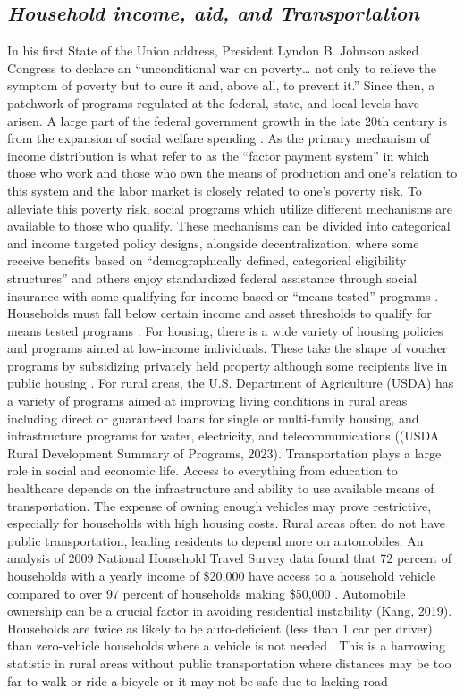 \subsection{\textit{Household income, aid, and Transportation }}
In his first State of the Union address, President Lyndon B. Johnson asked Congress to declare an “unconditional war on poverty… not only to relieve the symptom of poverty but to cure it and, above all, to prevent it.” Since then, a patchwork of programs regulated at the federal, state, and local levels have arisen. A large part of the federal government growth in the late 20th century is from the expansion of social welfare spending \citep{fishback_social_2020}. As the primary mechanism of income distribution is what \citet{berkowitz_gaps_2023} refer to as the “factor payment system” in which those who work and those who own the means of production and one’s relation to this system and the labor market is closely related to one’s poverty risk. To alleviate this poverty risk, social programs which utilize different mechanisms are available to those who qualify. These mechanisms can be divided into categorical and income targeted policy designs, alongside decentralization, where some receive benefits based on “demographically defined, categorical eligibility structures” and others enjoy standardized federal assistance through social insurance with some qualifying for income-based or “means-tested” programs \citep{bruch_poverty_2023}. Households must fall below certain income and asset thresholds to qualify for means tested programs \citep{rank_welfare_2002}. For housing, there is a wide variety of housing policies and programs aimed at low-income individuals. These take the shape of voucher programs by subsidizing privately held property although some recipients live in public housing \citep{kim_housing_2017}. For rural areas, the U.S. Department of Agriculture (USDA) has a variety of programs aimed at improving living conditions in rural areas including direct or guaranteed loans for single or multi-family housing, and infrastructure programs for water, electricity, and telecommunications ((USDA Rural Development Summary of Programs, 2023). Transportation plays a large role in social and economic life. Access to everything from education to healthcare depends on the infrastructure and ability to use available means of transportation. The expense of owning enough vehicles may prove restrictive, especially for households with high housing costs. Rural areas often do not have public transportation, leading residents to depend more on automobiles. An analysis of 2009 National Household Travel Survey data found that 72 percent of households with a yearly income of \$20,000 have access to a household vehicle compared to over 97 percent of households making \$50,000 \citep{blumenberg_automobile_2012}. Automobile ownership can be a crucial factor in avoiding residential instability (Kang, 2019). Households are twice as likely to be auto-deficient (less than 1 car per driver) than zero-vehicle households where a vehicle is not needed \citep{blumenberg_car-deficit_2020}. This is a harrowing statistic in rural areas without public transportation where distances may be too far to walk or ride a bicycle or it may not be safe due to lacking road 